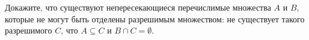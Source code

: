 Докажите, что существуют непересекающиеся перечислимые множества $A$ и $B$, которые не могут быть
отделены разрешимым множеством: не существует такого разрешимого $C$, что $A \subseteq C$ и $B \cap C =
\emptyset$.
